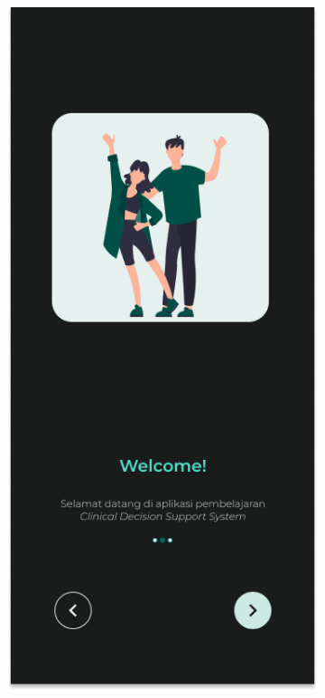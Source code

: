 \begin{figure}[H]
	\centering
	\begin{subfigure}[b]{0.25\textwidth}
		\centering
	  \includegraphics[width=\linewidth]{contents/chapter-3/images/HF-Boarding-1-dt.png}

\end{subfigure}
\end{figure}
